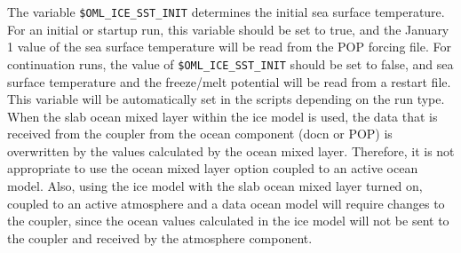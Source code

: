 The variable {\tt \$OML\_ICE\_SST\_INIT} determines the initial sea surface
temperature.  For an initial or startup run, this variable should be
set to true, and the January 1 value of the sea surface temperature
will be read from the POP forcing file.  For continuation runs, the
value of {\tt \$OML\_ICE\_SST\_INIT} should be set to false, and sea
surface temperature and the freeze/melt potential will be read from a restart file.
This variable will be automatically set in the scripts depending on the
run type.  When the slab ocean mixed layer within the ice model is used,
the data that is received from the coupler from the ocean component
(docn or POP) is overwritten by the values calculated by the ocean mixed
layer. Therefore, it is not appropriate to use the ocean mixed layer option
coupled to an active ocean model.  Also, using the ice model with the slab ocean
mixed layer turned on, coupled to an active atmosphere and a data ocean model
will require changes to the coupler, since the ocean values calculated in the
ice model will not be sent to the coupler and received by the atmosphere component.
